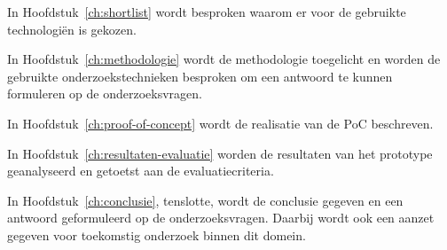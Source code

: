 In Hoofdstuk~\ref{ch:shortlist} wordt besproken waarom er voor de gebruikte technologiën is gekozen.

In Hoofdstuk~\ref{ch:methodologie} wordt de methodologie toegelicht en worden de gebruikte onderzoekstechnieken besproken om een antwoord te kunnen formuleren op de onderzoeksvragen.

In Hoofdstuk~\ref{ch:proof-of-concept} wordt de realisatie van de \gls{PoC} beschreven.

In Hoofdstuk~\ref{ch:resultaten-evaluatie} worden de resultaten van het prototype geanalyseerd en getoetst aan de evaluatiecriteria.

In Hoofdstuk~\ref{ch:conclusie}, tenslotte, wordt de conclusie gegeven en een antwoord geformuleerd op de onderzoeksvragen. Daarbij wordt ook een aanzet gegeven voor toekomstig onderzoek binnen dit domein.